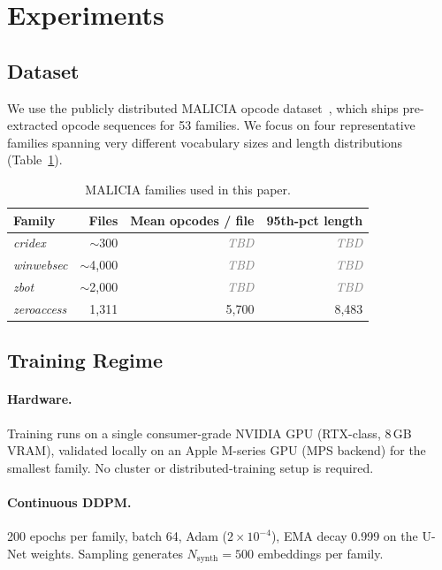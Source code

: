 \documentclass[runningheads]{llncs}
\newcommand{\todoval}{\textcolor{gray}{\textit{TBD}}}
\begin{document}
\section{Experiments}
\label{sec:experiments}

\subsection{Dataset}

We use the publicly distributed MALICIA opcode dataset~\cite{nappa2015malicia},
which ships pre-extracted opcode sequences for 53 families. We focus on four
representative families spanning very different vocabulary sizes and length
distributions (Table~\ref{tab:families}).

\begin{table}[h]
\centering
\caption{MALICIA families used in this paper.}
\label{tab:families}
\begin{tabular}{lrrr}
\toprule
Family & Files & Mean opcodes / file & 95th-pct length \\
\midrule
\emph{cridex}      & $\sim$300     & \todoval & \todoval \\
\emph{winwebsec}   & $\sim$4{,}000 & \todoval & \todoval \\
\emph{zbot}        & $\sim$2{,}000 & \todoval & \todoval \\
\emph{zeroaccess}  & 1{,}311       & 5{,}700  & 8{,}483  \\
\bottomrule
\end{tabular}
\end{table}

\subsection{Training Regime}

\paragraph{Hardware.}
Training runs on a single consumer-grade NVIDIA GPU (RTX-class, 8\,GB VRAM),
validated locally on an Apple M-series GPU (MPS backend) for the smallest
family. No cluster or distributed-training setup is required.

\paragraph{Continuous DDPM.}
200 epochs per family, batch 64, Adam ($2 \times 10^{-4}$), EMA decay 0.999 on
the U-Net weights. Sampling generates $N_{\text{synth}}=500$ embeddings per
family.
\end{document}
